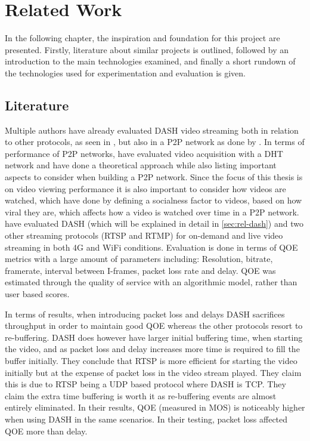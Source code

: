 \chapter{Related Work}
\label{cha:related-work}
In the following chapter, the inspiration and foundation for this project are presented. Firstly, literature about similar projects is outlined, followed by an introduction to the main technologies examined, and finally a short rundown of the technologies used for experimentation and evaluation is given. 

\section{Literature}
Multiple authors have already evaluated \ac{DASH} video streaming both in relation to other protocols, as seen in \citet{aloman2015performance}, but also in a \ac{P2P} network as done by \citet{gazdar2017toward}. In terms of performance of \ac{P2P} networks, \citet{nguyen2009p2p} have evaluated video acquisition with a \ac{DHT} network and \citet{qiu2004modeling} have done a theoretical approach while also listing important aspects to consider when building a \ac{P2P} network. Since the focus of this thesis is on video viewing performance it is also important to consider how videos are watched, which \citet{broxton2013catching} have done by defining a socialness factor to videos, based on how viral they are, which affects how a video is watched over time in a \ac{P2P} network.
\\


\citet{aloman2015performance} have evaluated \ac{DASH} (which will be explained in detail in \autoref{sec:rel-dash}) and two other streaming protocols (\ac{RTSP} and \ac{RTMP}) for on-demand and live video streaming in both 4G and WiFi conditions. Evaluation is done in terms of \ac{QOE} metrics with a large amount of parameters including: Resolution, bitrate, framerate, interval between \acsp{I-frame}, packet loss rate and delay. \ac{QOE} was estimated through the quality of service with an algorithmic model, rather than user based scores.

In terms of results, when introducing packet loss and delays \ac{DASH} sacrifices throughput in order to maintain good \ac{QOE} whereas the other protocols resort to re-buffering. \ac{DASH} does however have larger initial buffering time, when starting the video, and as packet loss and delay increases more time is required to fill the buffer initially. They conclude that \ac{RTSP} is more efficient for starting the video initially but at the expense of packet loss in the video stream played. They claim this is due to \ac{RTSP} being a \ac{UDP} based protocol where \ac{DASH} is \ac{TCP}. They claim the extra time buffering is worth it as re-buffering events are almost entirely eliminated. In their results, \ac{QOE} (measured in \ac{MOS}) is noticeably higher when using \ac{DASH} in the same scenarios. In their testing, packet loss affected \ac{QOE} more than delay.
\\


